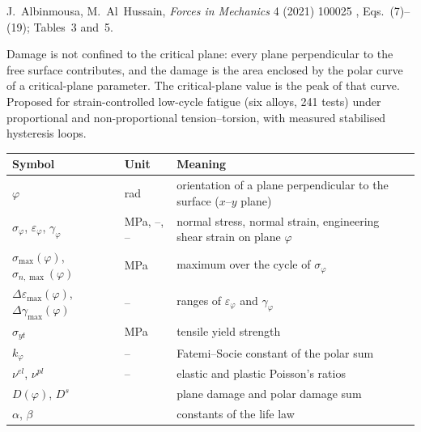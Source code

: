 \label{sheet:PDS}

 J.~Albinmousa, M.~Al~Hussain, \emph{Forces in Mechanics} 4 (2021) 100025
\cite{albinmousa2021}, Eqs.~(7)--(19); Tables~3 and~5.

 Damage is not confined to the critical plane: every plane perpendicular to
the free surface contributes, and the damage is the area enclosed by the polar curve of a
critical-plane parameter. The critical-plane value is the peak of that curve. Proposed for
strain-controlled low-cycle fatigue (six alloys, 241 tests) under proportional and
non-proportional tension--torsion, with measured stabilised hysteresis loops.

\begin{center}\small
\begin{tabular}{@{}llp{100mm}@{}}
\toprule
Symbol & Unit & Meaning\\\midrule
$\varphi$ & rad & orientation of a plane perpendicular to the surface ($x$--$y$ plane)\\
$\sigma_\varphi$, $\varepsilon_\varphi$, $\gamma_\varphi$ & MPa, --, -- & normal stress, normal strain, engineering shear strain on plane $\varphi$\\
$\sigma_{\max}(\varphi)$, $\sigma_{n,\max}(\varphi)$ & MPa & maximum over the cycle of $\sigma_\varphi$\\
$\Delta\varepsilon_{\max}(\varphi)$, $\Delta\gamma_{\max}(\varphi)$ & -- & ranges of $\varepsilon_\varphi$ and $\gamma_\varphi$\\
$\sigma_{yt}$ & MPa & tensile yield strength\\
$k_\varphi$ & -- & Fatemi--Socie constant of the polar sum\\
$\nu^{el}$, $\nu^{pl}$ & -- & elastic and plastic Poisson's ratios\\
$D(\varphi)$, $D^s$ & & plane damage and polar damage sum\\
$\alpha$, $\beta$ & & constants of the life law\\
\bottomrule
\end{tabular}
\end{center}

